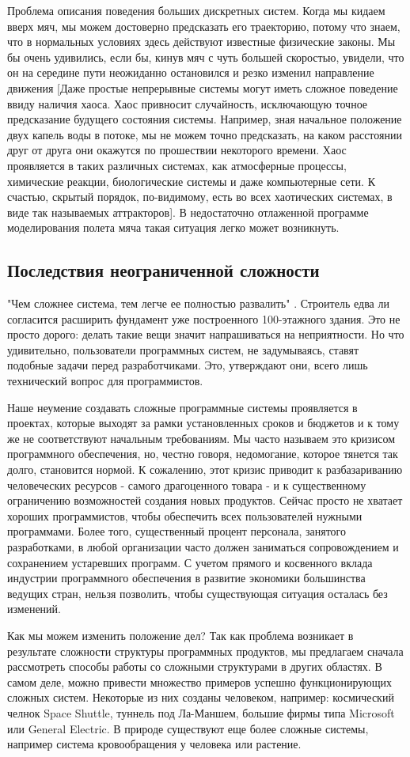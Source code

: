 \documentclass[11pt]{article}
\begin{document}
Проблема описания поведения больших дискретных систем. Когда мы кидаем вверх мяч, мы можем достоверно предсказать его траекторию, потому что знаем, что в нормальных условиях здесь действуют известные физические законы. Мы бы очень удивились, если бы, кинув мяч с чуть большей скоростью, увидели, что он на середине пути неожиданно остановился и резко изменил направление движения [Даже простые непрерывные системы могут иметь сложное поведение ввиду наличия хаоса. Хаос привносит случайность, исключающую точное предсказание будущего состояния системы. Например, зная начальное положение двух капель воды в потоке, мы не можем точно предсказать, на каком расстоянии друг от друга они окажутся по прошествии некоторого времени. Хаос проявляется в таких различных системах, как атмосферные процессы, химические реакции, биологические системы и даже компьютерные сети. К счастью, скрытый порядок, по-видимому, есть во всех хаотических системах, в виде так называемых аттракторов]. В недостаточно отлаженной программе моделирования полета мяча такая ситуация легко может возникнуть.
\subsection{Последствия неограниченной сложности }
"Чем сложнее система, тем легче ее полностью развалить" \cite[p.153]{5}. Строитель едва ли согласится расширить фундамент уже построенного 100-этажного здания. Это не просто дорого: делать такие вещи значит напрашиваться на неприятности. Но что удивительно, пользователи программных систем, не задумываясь, ставят подобные задачи перед разработчиками. Это, утверждают они, всего лишь технический вопрос для программистов.\par
Наше неумение создавать сложные программные системы проявляется в проектах, которые выходят за рамки установленных сроков и бюджетов и к тому же не соответствуют начальным требованиям. Мы часто называем это кризисом программного обеспечения, но, честно говоря, недомогание, которое тянется так долго, становится нормой. К сожалению, этот кризис приводит к разбазариванию человеческих ресурсов - самого драгоценного товара - и к существенному ограничению возможностей создания новых продуктов. Сейчас просто не хватает хороших программистов, чтобы обеспечить всех пользователей нужными программами. Более того, существенный процент персонала, занятого разработками, в любой организации часто должен заниматься сопровождением и сохранением устаревших программ. С учетом прямого и косвенного вклада индустрии программного обеспечения в развитие экономики большинства ведущих стран, нельзя позволить, чтобы существующая ситуация осталась без изменений.\par
Как мы можем изменить положение дел? Так как проблема возникает в результате сложности структуры программных продуктов, мы предлагаем сначала рассмотреть способы работы со сложными структурами в других областях. В самом деле, можно привести множество примеров успешно функционирующих сложных систем. Некоторые из них созданы человеком, например: космический челнок Space Shuttle, туннель под Ла-Маншем, большие фирмы типа Microsoft или General Electric. В природе существуют еще более сложные системы, например система кровообращения у человека или растение.
\end{document}
